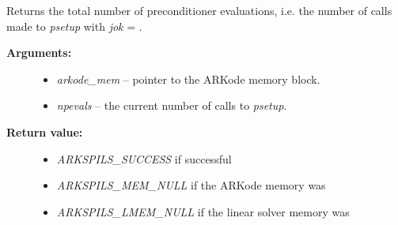 \documentclass[letterpaper,10pt,english]{sphinxmanual}
\begin{document}
\begin{fulllineitems}
\label{c_interface/User_callable:c.ARKSpilsGetNumPrecEvals}
Returns the total number of preconditioner evaluations,
i.e. the number of calls made to \emph{psetup} with \emph{jok} = .
\begin{description}
\item[{\textbf{Arguments:}}] \leavevmode\begin{itemize}
\item {} 
\emph{arkode\_mem} -- pointer to the ARKode memory block.

\item {} 
\emph{npevals} -- the current number of calls to \emph{psetup}.

\end{itemize}

\item[{\textbf{Return value:}}] \leavevmode\begin{itemize}
\item {} 
\emph{ARKSPILS\_SUCCESS} if successful

\item {} 
\emph{ARKSPILS\_MEM\_NULL} if the ARKode memory was 

\item {} 
\emph{ARKSPILS\_LMEM\_NULL} if the linear solver memory was 

\end{itemize}

\end{description}

\end{fulllineitems}

\end{document}
